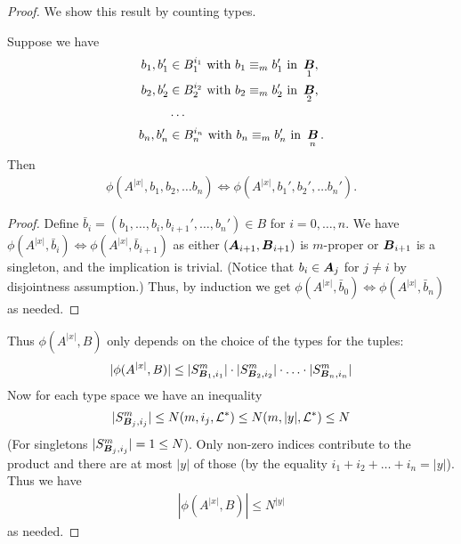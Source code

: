 \documentclass{amsart}
\DeclareMathOperator{\AT}{\boldface A}
\DeclareMathOperator{\BT}{\boldface B}
\renewcommand{\LL}{\mathcal L}
\newcommand{\LLU}{\LL^*}
\begin{document}
\begin{proof}
  We show this result by counting types.
  \begin{Claim}
    Suppose we have
    \begin{align*}
      b_1, b_1' &\in B_1^{i_1} \text{ with } b_1 \equiv_m b_1' \text { in } \BT_1, \\
      b_2, b_2' &\in B_2^{i_2} \text{ with } b_2 \equiv_m b_2' \text { in } \BT_2, \\
                &\cdots \\
      b_n, b_n' &\in B_n^{i_n} \text{ with } b_n \equiv_m b_n' \text { in } \BT_n.
    \end{align*}
    Then
    \begin{align*}
      \phi(A^{|x|}, b_1, b_2, \ldots b_n) \iff \phi(A^{|x|}, b_1', b_2', \ldots b_n').
    \end{align*}
  \end{Claim}
  \begin{proof}
    Define $\bar b_i = (b_1, \ldots, b_i, b_{i+1}', \ldots, b_n') \in B$ for $i = 0, \ldots, n$.
    We have $\phi(A^{|x|}, \bar b_i) \iff \phi(A^{|x|}, \bar b_{i+1})$ as either $(\AT_{i+1}, \BT_{i+1})$ is $m$-proper
    or $\BT_{i+1}$ is a singleton, and the implication is trivial.
    (Notice that $b_i \in \AT_j$ for $j \neq i$ by disjointness assumption.)
    Thus, by induction we get $\phi(A^{|x|}, \bar b_0) \iff \phi(A^{|x|}, \bar b_n)$ as needed.
  \end{proof}
  Thus $\phi(A^{|x|}, B)$ only depends on the choice of the types for the tuples:
  \begin{align*}
    |\phi(A^{|x|}, B)| \leq |S^m_{\BT_1, i_1}| \cdot |S^m_{\BT_2, i_2}| \cdot \ldots \cdot |S^m_{\BT_n, i_n}|
  \end{align*}
  Now for each type space we have an inequality
  \begin{align*}
    |S^m_{\BT_j, i_j}| \leq N(m, i_j, \LLU) \leq N(m, |y|, \LLU) \leq N
  \end{align*}
  (For singletons $|S^m_{\BT_j, i_j}| = 1 \leq N$). Only non-zero indices contribute to the product and there are at most $|y|$ of those (by the equality $i_1 + i_2 + \ldots + i_n = |y|$). Thus we have
  \begin{align*}
    |\phi(A^{|x|}, B)| \leq N^{|y|}
  \end{align*}
  as needed.
\end{proof}
\end{document}
